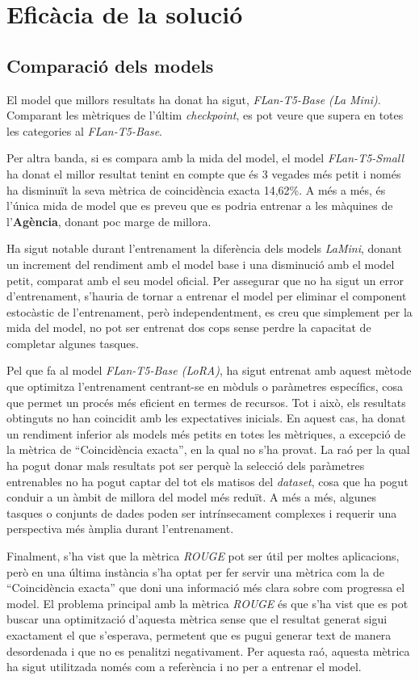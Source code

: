 \section{Eficàcia de la solució}

\subsection{Comparació dels models}
El model que millors resultats ha donat ha sigut, \textit{FLan-T5-Base (La Mini)}. Comparant les mètriques de l'últim \textit{checkpoint}, es pot veure que supera en totes les categories al \textit{FLan-T5-Base}. 

Per altra banda, si es compara amb la mida del model, el model \textit{FLan-T5-Small} ha donat el millor resultat tenint en compte que és 3 vegades més petit i només ha disminuït la seva mètrica de coincidència exacta 14,62\%. A més a més, és l'única mida de model que es preveu que es podria entrenar a les màquines de l'\textbf{Agència}, donant poc marge de millora.

Ha sigut notable durant l'entrenament la diferència dels models \textit{LaMini}, donant un increment del rendiment amb el model base i una disminució amb el model petit, comparat amb el seu model oficial. Per assegurar que no ha sigut un error d'entrenament, s'hauria de tornar a entrenar el model per eliminar el component estocàstic de l'entrenament, però independentment, es creu que simplement per la mida del model, no pot ser entrenat dos cops sense perdre la capacitat de completar algunes tasques.

Pel que fa al model \textit{FLan-T5-Base (LoRA)}, ha sigut entrenat amb aquest mètode que optimitza l'entrenament centrant-se en mòduls o paràmetres específics, cosa que permet un procés més eficient en termes de recursos. Tot i això, els resultats obtinguts no han coincidit amb les expectatives inicials. En aquest cas, ha donat un rendiment inferior als models més petits en totes les mètriques, a excepció de la mètrica de ``Coincidència exacta'', en la qual no s'ha provat. La raó per la qual ha pogut donar mals resultats pot ser perquè la selecció dels paràmetres entrenables no ha pogut captar del tot els matisos del \textit{dataset}, cosa que ha pogut conduir a un àmbit de millora del model més reduït. A més a més, algunes tasques o conjunts de dades poden ser intrínsecament complexes i requerir una perspectiva més àmplia durant l'entrenament. 

Finalment, s'ha vist que la mètrica \textit{ROUGE} pot ser útil per moltes aplicacions, però en una última instància s'ha optat per fer servir una mètrica com la de ``Coincidència exacta'' que doni una informació més clara sobre com progressa el model. El problema principal amb la mètrica \textit{ROUGE} és que s'ha vist que es pot buscar una optimització d'aquesta mètrica sense que el resultat generat sigui exactament el que s'esperava, permetent que es pugui generar text de manera desordenada i que no es penalitzi negativament. Per aquesta raó, aquesta mètrica ha sigut utilitzada només com a referència i no per a entrenar el model.






